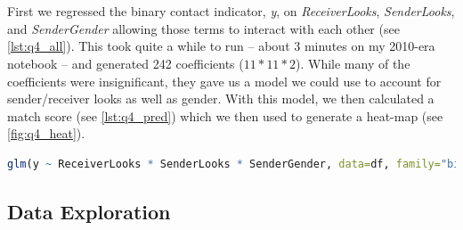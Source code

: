 \section{}
First we regressed the binary contact indicator, \textit{y}, on \textit{ReceiverLooks}, \textit{SenderLooks}, and \textit{SenderGender} allowing those terms to interact with each other (see \vref{lst:q4_all}).  This took quite a while to run -- about 3 minutes on my 2010-era notebook -- and generated 242 coefficients ($11 * 11 * 2$).  While many of the coefficients were insignificant, they gave us a model we could use to account for sender/receiver looks as well as gender.  With this model, we then calculated a match score (see \vref{lst:q4_pred}) which we then used to generate a heat-map (see \vref{fig:q4_heat}).

\begin{lstlisting}[language=R,label=lst:q4_all,caption=Regressing y on all available data.]
glm(y ~ ReceiverLooks * SenderLooks * SenderGender, data=df, family="binomial")
\end{lstlisting}



\clearpage
\begin{appendices}

\section{Data Exploration} \label{app:1}



\end{appendices}



% 


